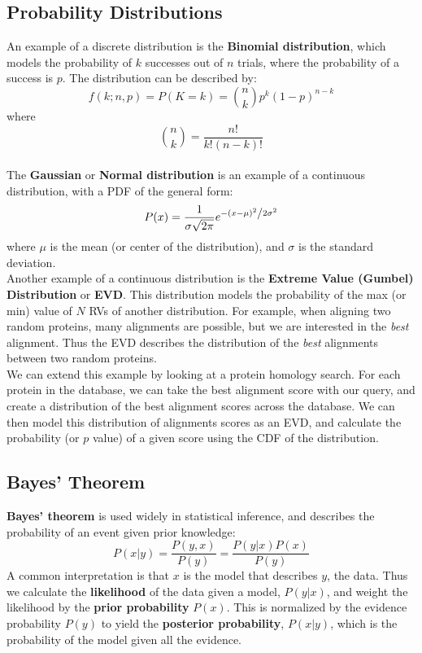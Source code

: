 \documentclass[12pt]{article}
\begin{document}
\subsection{Probability Distributions}
An example of a discrete distribution is the \textbf{Binomial distribution}, which models the probability of $k$ successes out of $n$ trials, where the probability of a success is $p$. The distribution can be described by:
$$f(k;n,p) = P(K=k) = \binom{n}{k}p^k(1-p)^{n-k}$$
where
$$\binom{n}{k} = \frac{n!}{k!(n-k)!}$$\\
The \textbf{Gaussian} or \textbf{Normal distribution} is an example of a continuous distribution, with a PDF of the general form:
$$P(x) = \frac{1}{{\sigma \sqrt {2\pi } }}e^{{{ - \left( {x - \mu } \right)^2 } \mathord{\left/ {\vphantom {{ - \left( {x - \mu } \right)^2 } {2\sigma ^2 }}} \right. \kern-\nulldelimiterspace} {2\sigma ^2 }}}$$
where $\mu$ is the mean (or center of the distribution), and $\sigma$ is the standard deviation.\\[10pt]
Another example of a continuous distribution is the \textbf{Extreme Value (Gumbel) Distribution} or \textbf{EVD}. This distribution models the probability of the max (or min) value of $N$ RVs of another distribution. For example, when aligning two random proteins, many alignments are possible, but we are interested in the \textit{best} alignment. Thus the EVD describes the distribution of the \textit{best} alignments between two random proteins.\\[10pt]
We can extend this example by looking at a protein homology search. For each protein in the database, we can take the best alignment score with our query, and create a distribution of the best alignment scores across the database. We can then model this distribution of alignments scores as an EVD, and calculate the probability (or $p$ value) of a given score using the CDF of the distribution.

\subsection{Bayes' Theorem}
\textbf{Bayes' theorem} is used widely in statistical inference, and describes the probability of an event given prior knowledge:
$$P(x|y) = \frac{P(y ,x)}{P(y)} = \frac{P(y |x)P(x)}{P(y)}$$
A common interpretation is that $x$ is the model that describes $y$, the data. Thus we calculate the \textbf{likelihood} of the data given a model, $P(y|x)$, and weight the likelihood by the \textbf{prior probability} $P(x)$. This is normalized by the evidence probability $P(y)$ to yield the \textbf{posterior probability}, $P(x|y)$, which is the probability of the model given all the evidence.
\end{document}
